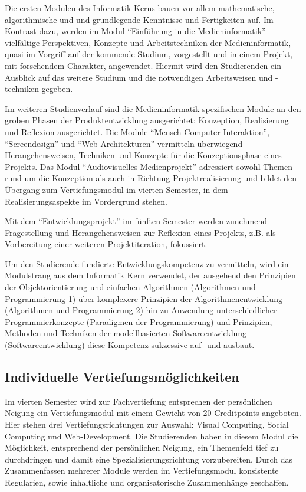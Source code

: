 Die ersten Modulen des Informatik Kerns bauen vor allem mathematische,
algorithmische und und grundlegende Kenntnisse und Fertigkeiten auf. Im
Kontrast dazu, werden im Modul ``Einführung in die Medieninformatik''
vielfältige Perspektiven, Konzepte und Arbeitstechniken der
Medieninformatik, quasi im Vorgriff auf der kommende Studium,
vorgestellt und in einem Projekt, mit forschendem Charakter, angewendet.
Hiermit wird den Studierenden ein Ausblick auf das weitere Studium und
die notwendigen Arbeitsweisen und -techniken gegeben.

Im weiteren Studienverlauf sind die Medieninformatik-spezifischen Module
an den groben Phasen der Produktentwicklung ausgerichtet: Konzeption,
Realisierung und Reflexion ausgerichtet. Die Module ``Mensch-Computer
Interaktion'', ``Screendesign'' und ``Web-Architekturen'' vermitteln
überwiegend Herangehensweisen, Techniken und Konzepte für die
Konzeptionsphase eines Projekts. Das Modul ``Audiovisuelles
Medienprojekt'' adressiert sowohl Themen rund um die Konzeption als auch
in Richtung Projektrealisierung und bildet den Übergang zum
Vertiefungsmodul im vierten Semester, in dem Realisierungsaspekte im
Vordergrund stehen.

Mit dem ``Entwicklungsprojekt'' im fünften Semester werden zunehmend
Fragestellung und Herangehensweisen zur Reflexion eines Projekts, z.B.
als Vorbereitung einer weiteren Projektiteration, fokussiert.

Um den Studierende fundierte Entwicklungskompetenz zu vermitteln, wird
ein Modulstrang aus dem Informatik Kern verwendet, der ausgehend den
Prinzipien der Objektorientierung und einfachen Algorithmen (Algorithmen
und Programmierung 1) über komplexere Prinzipien der
Algorithmenentwicklung (Algorithmen und Programmierung 2) hin zu
Anwendung unterschiedlicher Programmierkonzepte (Paradigmen der
Programmierung) und Prinzipien, Methoden und Techniken der
modellbasierten Softwareentwicklung (Softwareentwicklung) diese
Kompetenz sukzessive auf- und ausbaut.

\subsection{Individuelle
Vertiefungsmöglichkeiten}\label{individuelle-vertiefungsmuxf6glichkeiten}

Im vierten Semester wird zur Fachvertiefung entsprechen der persönlichen
Neigung ein Vertiefungsmodul mit einem Gewicht von 20 Creditpoints
angeboten. Hier stehen drei Vertiefungsrichtungen zur Auswahl: Visual
Computing, Social Computing und Web-Development. Die Studierenden haben
in diesem Modul die Möglichkeit, entsprechend der persönlichen Neigung,
ein Themenfeld tief zu durchdringen und damit eine
Spezialisierungsrichtung vorzubereiten. Durch das Zusammenfassen
mehrerer Module werden im Vertiefungsmodul konsistente Regularien, sowie
inhaltliche und organisatorische Zusammenhänge geschaffen.

